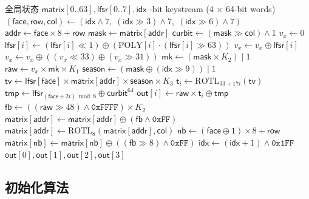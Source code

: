 \documentclass[11pt,a4paper]{ctexart}
\begin{document}
\begin{algorithm}[H]
\caption{单步密钥流生成 $\mathsf{next}()$}
\label{alg:next}
\begin{algorithmic}[1]
\Require 全局状态 $\mathsf{matrix}[0..63], \mathsf{lfsr}[0..7], \mathsf{idx}$
-bit keystream (4 $\times$ 64-bit words)
\State $(\mathsf{face}, \mathsf{row}, \mathsf{col}) \gets (\mathsf{idx} \land 7,\; (\mathsf{idx} \gg 3) \land 7,\; (\mathsf{idx} \gg 6) \land 7)$
\State $\mathsf{addr} \gets \mathsf{face} \times 8 + \mathsf{row}$
\State $\mathsf{mask} \gets \mathsf{matrix}[\mathsf{addr}]$
\State $\mathsf{curbit} \gets (\mathsf{mask} \gg \mathsf{col}) \land 1$
\State $v_x \gets 0$
    \State $\mathsf{lfsr}[i] \gets (\mathsf{lfsr}[i] \ll 1) \oplus (\mathrm{POLY}[i] \cdot (\mathsf{lfsr}[i] \gg 63))$
    \State $v_x \gets v_x \oplus \mathsf{lfsr}[i]$
\EndFor
\State $v_x \gets v_x \oplus ((v_x \ll 33) \oplus (v_x \gg 31))$
\State $\mathsf{mk} \gets (\mathsf{mask} \times K_2) \mid 1$
\State $\mathsf{raw} \gets v_x \times \mathsf{mk} \times K_1$
\State $\mathsf{season} \gets (\mathsf{mask} \oplus (\mathsf{idx} \gg 9)) \mid 1$
\State $\mathsf{tv} \gets \mathsf{lfsr}[\mathsf{face}] \times \mathsf{matrix}[\mathsf{addr}] \times \mathsf{season} \times K_3$
    \State $\mathsf{t}_i \gets \mathrm{ROTL}_{33+17i}(\mathsf{tv})$
\State $\mathsf{tmp} \gets \mathsf{lfsr}_{(\mathsf{face}+2i)\bmod 8} \oplus \mathsf{curbit}^{64}$
\State $\mathsf{out}[i] \gets \mathsf{raw} \times \mathsf{t}_i \oplus \mathsf{tmp}$
\EndFor
\State $\mathsf{fb} \gets ((\mathsf{raw} \gg 48) \land \mathtt{0xFFFF}) \times K_2$
\State $\mathsf{matrix}[\mathsf{addr}] \gets \mathsf{matrix}[\mathsf{addr}] \oplus (\mathsf{fb} \land \mathtt{0xFF})$
\State $\mathsf{matrix}[\mathsf{addr}] \gets \mathrm{ROTL}_8(\mathsf{matrix}[\mathsf{addr}], \mathsf{col})$
\State $\mathsf{nb} \gets (\mathsf{face} \oplus 1) \times 8 + \mathsf{row}$
\State $\mathsf{matrix}[\mathsf{nb}] \gets \mathsf{matrix}[\mathsf{nb}] \oplus ((\mathsf{fb} \gg 8) \land \mathtt{0xFF})$
\State $\mathsf{idx} \gets (\mathsf{idx} + 1) \land \mathtt{0x1FF}$
\State \Return $\mathsf{out}[0], \mathsf{out}[1], \mathsf{out}[2], \mathsf{out}[3]$
\end{algorithmic}
\end{algorithm}

\subsection{初始化算法}
\end{document}
